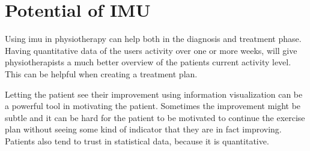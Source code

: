 

\section{Potential of IMU}
Using \gls{imu} in physiotherapy can help both in the diagnosis and treatment phase. Having quantitative data of the users activity over one or more weeks, will give physiotherapists a much better overview of the patients current activity level. This can be helpful when creating a treatment plan.

Letting the patient see their improvement using information visualization can be a powerful tool in motivating the patient. Sometimes the improvement might be subtle and it can be hard for the patient to be motivated to continue the exercise plan without seeing some kind of indicator that they are in fact improving. Patients also tend to trust in statistical data, because it is quantitative. 



